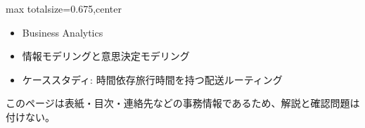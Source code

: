 \clearpage
{}
\begin{adjustbox}{max totalsize={\textwidth}{0.675\textheight},center}
\begin{minipage}{\textwidth}\scriptsize
\begin{minipage}[t]{0.485\textwidth}
\begin{itemize}
\item Business Analytics
\item 情報モデリングと意思決定モデリング
\item ケーススタディ: 時間依存旅行時間を持つ配送ルーティング
\end{itemize}
\end{minipage}\hfill
\begin{minipage}[t]{0.485\textwidth}
{\small このページは表紙・目次・連絡先などの事務情報であるため、解説と確認問題は付けない。}
\end{minipage}
\end{minipage}
\end{adjustbox}
